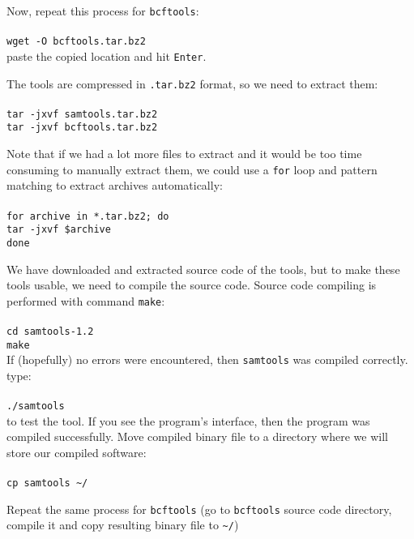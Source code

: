Now, repeat this process for \texttt{bcftools}:\\~\\
\texttt{wget -O bcftools.tar.bz2}\\
paste the copied location and hit \texttt{Enter}.

The tools are compressed in \texttt{.tar.bz2}
format, so we need to extract them:\\~\\
\texttt{tar -jxvf samtools.tar.bz2}\\
\texttt{tar -jxvf bcftools.tar.bz2}\\

\begin{framed}
Note that if we had a lot more files to extract and it would be too
time consuming to manually extract them, we could use a \texttt{for}
loop and pattern matching to extract archives automatically:\\~\\
\texttt{for archive in *.tar.bz2; do}\\
\texttt{\indent tar -jxvf \$archive}\\
\texttt{done}\\
\end{framed}

We have downloaded and extracted source code of the tools, but to make
these tools usable, we need to compile the source code. Source code compiling
is performed with command \texttt{make}:\\~\\
\texttt{cd samtools-1.2}\\
\texttt{make}\\

If (hopefully) no errors were encountered, then \texttt{samtools} was compiled correctly. type:\\~\\
\texttt{./samtools}\\

to test the tool. If you see the program's interface, then the program was compiled successfully.
Move compiled binary file to a directory where we will store our compiled software:\\~\\
\texttt{cp samtools \textasciitilde/\binDir\\}

Repeat the same process for \texttt{bcftools}
(go to \texttt{bcftools} source code directory,
compile it and copy resulting binary file to \texttt{\textasciitilde/\binDir})
